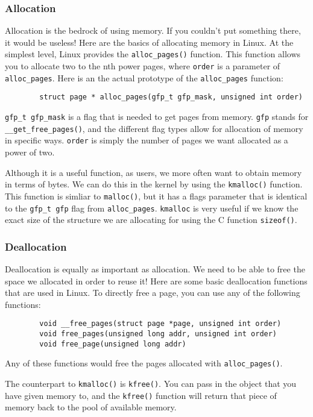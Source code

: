 	\subsubsection{Allocation}
	Allocation is the bedrock of using memory. If you couldn't put something
	there, it would be useless! Here are the basics of allocating memory in
	Linux. At the simplest level, Linux provides the \texttt{alloc\_pages()}
	function. This function allows you to allocate two to the nth power pages,
	where \texttt{order} is a parameter of \texttt{alloc\_pages}. Here is an
	the actual prototype of the \texttt{alloc\_pages} function:
	\begin{lstlisting}
		struct page * alloc_pages(gfp_t gfp_mask, unsigned int order)
	\end{lstlisting}
	\texttt{gfp\_t gfp\_mask} is a flag that is needed to get pages from memory.
	\texttt{gfp} stands for \texttt{\_\_get\_free\_pages()}, and the different
	flag types allow for allocation of memory in specific ways.\cite{robertlove2010}
	\texttt{order} is simply the number of pages we want allocated as a power
	of two.

	Although it is a useful function, as users, we more often want to obtain
	memory in terms of bytes. We can do this in the kernel by using the
	\texttt{kmalloc()} function. This function is simliar to \texttt{malloc()},
	but it has a flags parameter that is identical to the \texttt{gfp\_t gfp}
	flag from \texttt{alloc\_pages}. \texttt{kmalloc} is very useful if we
	know the exact size of the structure we are allocating for using the C
	function \texttt{sizeof()}.

	\subsubsection{Deallocation}
	Deallocation is equally as important as allocation. We need to be able
	to free the space we allocated in order to reuse it! Here are some basic
	deallocation functions that are used in Linux. To directly free a page,
	you can use any of the following functions:
	\begin{lstlisting}
		void __free_pages(struct page *page, unsigned int order)
		void free_pages(unsigned long addr, unsigned int order)
		void free_page(unsigned long addr)
	\end{lstlisting}
	Any of these functions would free the pages allocated with \texttt{alloc\_pages()}.

	The counterpart to \texttt{kmalloc()} is \texttt{kfree()}. You can pass
	in the object that you have given memory to, and the \texttt{kfree()} function
	will return that piece of memory back to the pool of available memory.

